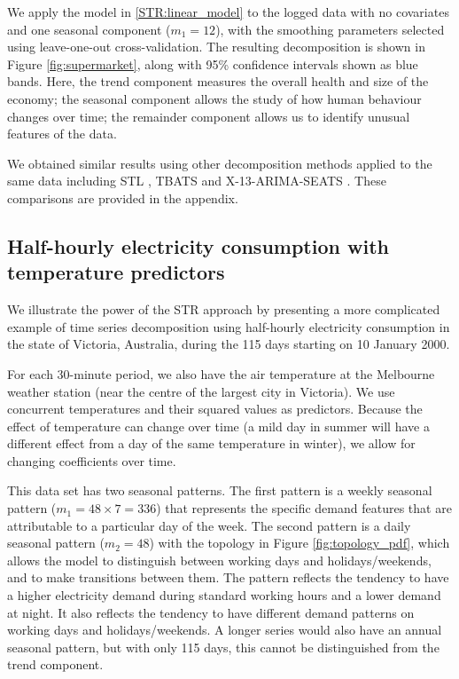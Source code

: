 \documentclass[11pt,a4paper,]{article}
\begin{document}
We apply the model in \eqref{STR:linear_model} to the logged data with no covariates and one seasonal component (\(m_1=12\)), with the smoothing parameters selected using leave-one-out cross-validation. The resulting decomposition is shown in Figure \ref{fig:supermarket}, along with 95\% confidence intervals shown as blue bands. Here, the trend component measures the overall health and size of the economy; the seasonal component allows the study of how human behaviour changes over time; the remainder component allows us to identify unusual features of the data.

We obtained similar results using other decomposition methods applied to the same data including STL \autocite{cleveland1990stl}, TBATS \autocite{delivera2011forecasting} and X-13-ARIMA-SEATS \autocite{findley2005some,Dagum2016}. These comparisons are provided in the appendix.

\FloatBarrier

\hypertarget{sec:one_more_example}{%
\subsection{Half-hourly electricity consumption with temperature predictors}\label{sec:one_more_example}}

We illustrate the power of the STR approach by presenting a more complicated example of time series decomposition using half-hourly electricity consumption in the state of Victoria, Australia, during the 115 days starting on 10 January 2000.

For each 30-minute period, we also have the air temperature at the Melbourne weather station (near the centre of the largest city in Victoria). We use concurrent temperatures and their squared values as predictors. Because the effect of temperature can change over time (a mild day in summer will have a different effect from a day of the same temperature in winter), we allow for changing coefficients over time.

This data set has two seasonal patterns. The first pattern is a weekly seasonal pattern (\(m_1=48\times7=336\)) that represents the specific demand features that are attributable to a particular day of the week. The second pattern is a daily seasonal pattern (\(m_2=48\)) with the topology in Figure \ref{fig:topology_pdf}, which allows the model to distinguish between working days and holidays/weekends, and to make transitions between them. The pattern reflects the tendency to have a higher electricity demand during standard working hours and a lower demand at night. It also reflects the tendency to have different demand patterns on working days and holidays/weekends. A longer series would also have an annual seasonal pattern, but with only 115 days, this cannot be distinguished from the trend component.
\end{document}
